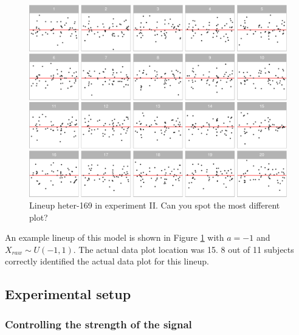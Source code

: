 \documentclass[]{interact}
\theoremstyle{plain}%
\theoremstyle{definition}
\theoremstyle{remark}
\begin{document}
\begin{figure}

{\centering \includegraphics[width=1\linewidth]{paper_comparison_files/figure-latex/example-heter-lineup-1} 

}

\caption{Lineup heter-169 in experiment II. Can you spot the most different plot? \label{fig:example-heter-lineup}}\label{fig:example-heter-lineup}
\end{figure}

An example lineup of this model is shown in Figure
\ref{fig:example-heter-lineup} with \(a = -1\) and
\(X_{raw} \sim U(-1, 1)\). The actual data plot location was 15. 8 out
of 11 subjects correctly identified the actual data plot for this
lineup.

\hypertarget{experimental-setup}{%
\subsection{Experimental setup}\label{experimental-setup}}

\hypertarget{controlling-the-strength-of-the-signal}{%
\subsubsection{Controlling the strength of the
signal}\label{controlling-the-strength-of-the-signal}}
\end{document}
